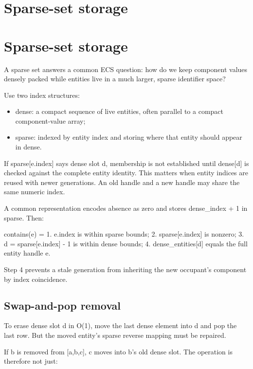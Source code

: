 \hypertarget{appendix-8404d0b1a3e7}{}
\section*{Sparse-set storage}
\section{Sparse-set storage}\label{sparse-set-storage}

A sparse set answers a common ECS question: how do we keep component values densely packed while entities live in a much larger, sparse identifier space?

Use two index structures:

\begin{itemize}
\tightlist
\item
  dense: a compact sequence of live entities, often parallel to a compact component-value array;
\item
  sparse: indexed by entity index and storing where that entity should appear in dense.
\end{itemize}

If sparse{[}e.index{]} says dense slot d, membership is not established until dense{[}d{]} is checked against the complete entity identity. This matters when entity indices are reused with newer generations. An old handle and a new handle may share the same numeric index.

A common representation encodes absence as zero and stores dense\_index + 1 in sparse. Then:

contains(e) = 1. e.index is within sparse bounds; 2. sparse{[}e.index{]} is nonzero; 3. d = sparse{[}e.index{]} - 1 is within dense bounds; 4. dense\_entities{[}d{]} equals the full entity handle e.

Step 4 prevents a stale generation from inheriting the new occupant's component by index coincidence.

\subsection{Swap-and-pop removal}\label{swap-and-pop-removal}

To erase dense slot d in O(1), move the last dense element into d and pop the last row. But the moved entity's sparse reverse mapping must be repaired.

If b is removed from {[}a,b,c{]}, c moves into b's old dense slot. The operation is therefore not just:


